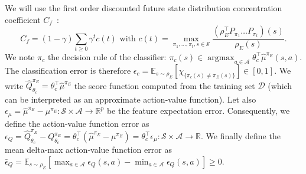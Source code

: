 \documentclass[english,utf8]{./hermes-journal}
\newcommand{\argmax}{\operatorname*{argmax}} %
\newcommand{\s}{\mathcal{S}}
\newcommand{\A}{\mathcal{A}}
\newcommand{\D}{\mathcal{D}}
\newcommand{\E}{\mathbb{E}}
\begin{document}
We will use the first order discounted future state distribution
concentration coefficient $C_f$~\cite{Munos:2007}:
\begin{equation}
  C_f = (1-\gamma)\sum_{t\geq 0} \gamma^t c(t) \text{ with } c(t) =
  \max_{\pi_1,\dots,\pi_t,s\in\s}\frac{(\rho_E^\top P_{\pi_1}\dots
  P_{\pi_t})(s)}{\rho_E(s)}.
\end{equation}
We note $\pi_c$ the decision rule of the classifier: $\pi_c(s) \in
\argmax_{a\in \A} \theta_c^\top\hat{\mu}^{\pi_E}(s,a)$. The
classification error is therefore $\epsilon_c =
\E_{s\sim\rho_E}[\chi_{\{\pi_c(s)\neq\pi_E(s)\}}] \in [0,1]$. We
write $\hat{Q}^{\pi_E}_{\theta_c} = \theta_c^\top \hat{\mu}^{\pi_E}$
the score function computed from the training set $\D$ (which can be
interpreted as an approximate action-value function). Let also
$\epsilon_{\mu} = \hat{\mu}^{\pi_E} - \mu^{\pi_E}:\s\times\A
\rightarrow  \mathbb{R}^p$ be the feature expectation error.
Consequently, we define the action-value function error as
$\epsilon_Q = \hat{Q}^{\pi_E}_{\theta_c} - Q^{\pi_E}_{\theta_c} =
\theta_c^\top(\hat{\mu}^{\pi_E} - \mu^{\pi_E}) = \theta_c^\top
\epsilon_\mu:\s\times\A\rightarrow\mathbb{R}$. We finally define the
mean delta-max action-value function error as $\bar{\epsilon}_Q =
\E_{s\sim\rho_E}[\max_{a\in\A}\epsilon_Q(s,a) -
\min_{a\in\A}\epsilon_Q(s,a)]\geq 0$.
\end{document}

